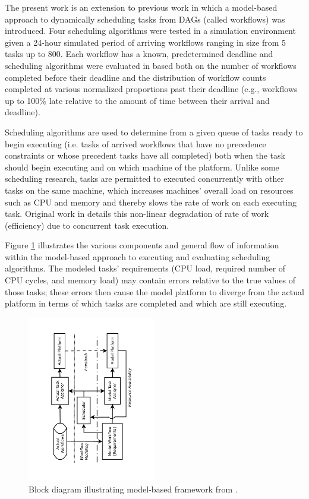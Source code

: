 \documentclass[10pt]{csce}
\begin{document}
The present work is an extension to previous work \cite{pdpta18} in which a
model-based approach to dynamically scheduling tasks from DAGs (called
workflows) was introduced.  Four scheduling algorithms were tested in a
simulation environment \cite{soasim} given a 24-hour simulated period
of arriving workflows ranging in size from 5 tasks up to 800.  Each workflow
has a known, predetermined deadline and scheduling algorithms were evaluated
in \cite{pdpta18} based both on the number of workflows completed before their
deadline and the distribution of workflow counts completed at various
normalized proportions past their deadline (e.g., workflows up to 100\% late
relative to the amount of time between their arrival and deadline).

Scheduling algorithms are used to determine \textemdash from a given queue of tasks
ready to begin executing (i.e. tasks of arrived workflows that have no
precedence constraints or whose precedent tasks have all completed)
\textemdash both when the task should begin executing and on which machine of
the platform. Unlike some scheduling research, tasks are permitted to executed
concurrently with other tasks on the same machine, which increases machines'
overall load on resources such as CPU and memory and thereby slows the rate of
work on each executing task.  Original work in \cite{pdpta09} details this
non-linear degradation of rate of work (efficiency) due to concurrent task
execution.

Figure \ref{fig:platform} illustrates the various components and general
flow of information within the model-based approach to executing and evaluating
scheduling algorithms.  The modeled tasks' requirements (CPU load,
required number of CPU cycles, and memory load) may contain errors relative to
the true values of those tasks; these errors then cause the model platform to
diverge from the actual platform in terms of which tasks are completed and
which are still executing.

\begin{figure}
	\begin{center}
		\includegraphics[angle=-90,width=0.5\textwidth]{figures/PlatformDiagram.pdf}
	\end{center}
	\caption{Block diagram illustrating model-based framework from
		\cite{pdpta18}.}
	\label{fig:platform}
\end{figure}
\end{document}
